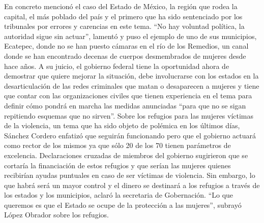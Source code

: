 \documentclass{article}%
\begin{document}
\newline%
%
En concreto mencionó el caso del Estado de México, la región que rodea la capital, el más poblado del país y el primero que ha sido sentenciado por los tribunales por errores y carencias en este tema.%
\newline%
%
“No hay voluntad política, la autoridad sigue sin actuar”, lamentó y puso el ejemplo de uno de sus municipios, Ecatepec, donde no se han puesto cámaras en el río de los Remedios, un canal donde se han encontrado decenas de cuerpos desmembrados de mujeres desde hace años.%
\newline%
%
A su juicio, el gobierno federal tiene la oportunidad ahora de demostrar que quiere mejorar la situación, debe involucrarse con los estados en la desarticulación de las redes criminales que matan o desaparecen a mujeres y tiene que contar con las organizaciones civiles que tienen experiencia en el tema para definir cómo pondrá en marcha las medidas anunciadas “para que no se sigan repitiendo esquemas que no sirven”.%
\newline%
%
Sobre los refugios para las mujeres víctimas de la violencia, un tema que ha sido objeto de polémica en los últimos días, Sánchez Cordero enfatizó que seguirán funcionando pero que el gobierno actuará como rector de los mismos ya que sólo 20 de los 70 tienen parámetros de excelencia.%
\newline%
%
Declaraciones cruzadas de miembros del gobierno sugirieron que se cortaría la financiación de estos refugios y que serían las mujeres quienes recibirían ayudas puntuales en caso de ser víctimas de violencia. Sin embargo, lo que habrá será un mayor control y el dinero se destinará a los refugios a través de los estados y los municipios, aclaró la secretaria de Gobernación.%
\newline%
%
“Lo que queremos es que el Estado se ocupe de la protección a las mujeres”, subrayó López Obrador sobre los refugios.%
\newline%
%
\end{document}
